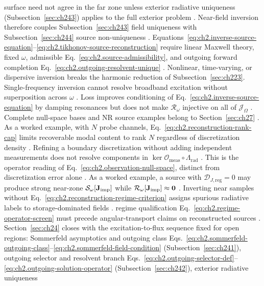 surface need not agree in the far zone unless exterior radiative uniqueness (Subsection~\ref{sec:ch243})
applies to the full exterior problem \cite{stratton1941}. Near-field
inversion therefore couples Subsection~\ref{sec:ch243} field uniqueness with
Subsection~\ref{sec:ch244} source non-uniqueness \cite{harrington2001}. Equations~\eqref{eq:ch2.inverse-source-equation}--\eqref{eq:ch2.tikhonov-source-reconstruction}
require linear Maxwell theory, fixed \(\omega\), admissible
Eq.~\eqref{eq:ch2.source-admissibility}, and outgoing forward completion
Eq.~\eqref{eq:ch2.outgoing-resolvent-unique} \cite{stratton1941}.
Nonlinear, time-varying, or dispersive inversion breaks the harmonic reduction of
Subsection~\ref{sec:ch223}. Single-frequency inversion cannot resolve broadband
excitation without superposition across \(\omega\) \cite{stratton1941}. Loss improves
conditioning of Eq.~\eqref{eq:ch2.inverse-source-equation} by damping resonances but
does not make \(\mathcal{R}_\omega\) injective on all of \(\mathcal{J}_\Omega\)
\cite{harrington2001}. Complete null-space bases and NR source examples belong to
Section~\ref{sec:ch27} \cite{stratton1941}.
As a worked example, with \(N\) probe channels, Eq.~\eqref{eq:ch2.reconstruction-rank-cap} limits
recoverable modal content to rank \(N\) regardless of discretization density
\cite{stratton1941}. Refining a boundary discretization without adding independent
measurements does not resolve components in
\(\ker\mathcal{O}_{\mathrm{meas}}\circ\Lambda_{\mathrm{rad}}\)
\cite{harrington2001}. This is the operator reading of
Eq.~\eqref{eq:ch2.observation-null-space}, distinct from discretization error alone
\cite{stratton1941}. As a worked example, a source with \(\mathcal{D}_{J,\mathrm{reg}}=0\) may produce strong near-zone
\(\mathcal{S}_\omega[\mathbf{J}_{\mathrm{imp}}]\) while \(\mathcal{R}_\omega[\mathbf{J}_{\mathrm{imp}}]\approx\mathbf{0}\)
\cite{stratton1941}. Inverting near samples without
Eq.~\eqref{eq:ch2.reconstruction-regime-criterion} assigns spurious radiative labels to
storage-dominated fields \cite{harrington2001}. regime qualification
Eq.~\eqref{eq:ch2.regime-operator-screen} must precede angular-transport claims on
reconstructed sources \cite{stratton1941}. \medskip
\noindent
Section~\ref{sec:ch24} closes with the excitation-to-flux sequence fixed for open regions:
Sommerfeld asymptotics and outgoing class
Eqs.~\eqref{eq:ch2.sommerfeld-outgoing-class}--\eqref{eq:ch2.sommerfeld-field-condition}
(Subsection~\ref{sec:ch241}), outgoing selector and resolvent branch
Eqs.~\eqref{eq:ch2.outgoing-selector-def}--\eqref{eq:ch2.outgoing-solution-operator}
(Subsection~\ref{sec:ch242}), exterior radiative uniqueness

